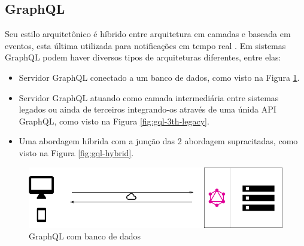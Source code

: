 \subsection{GraphQL}\label{graphql}

Seu estilo arquitetônico é híbrido entre arquitetura em camadas e
baseada em eventos, esta última utilizada para notificações em tempo
real \cite{graphql-arch:2017}. Em sistemas GraphQL podem haver diversos
tipos de arquiteturas diferentes, entre elas:

\begin{itemize}
\itemsep1pt\parskip0pt
\item
  Servidor GraphQL conectado a um banco de dados, como visto na Figura
  \ref{fig:gql-dbgql-db}.
\item
  Servidor GraphQL atuando como camada intermediária entre sistemas
  legados ou ainda de terceiros integrando-os através de uma únida API
  GraphQL, como visto na Figura \ref{fig:gql-3th-legacy}.
\item
  Uma abordagem híbrida com a junção das 2 abordagem supracitadas, como
  visto na Figura \ref{fig:gql-hybrid}.
\end{itemize}

\begin{figure}[h]
    \centering
    \includegraphics[scale=0.25]{img/gql-db.png}
    \caption{GraphQL com banco de dados}
    \label{fig:gql-dbgql-db}
\end{figure}

